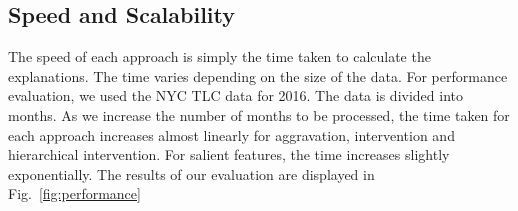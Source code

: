 




\subsection{Speed and Scalability}
\label{sec:speed}
The speed of each approach is simply the time taken to calculate the explanations. The time varies depending on the size of the data. For performance evaluation, we used the NYC TLC data for 2016. The data is divided into months. As we increase the number of months to be processed, the time taken for each approach increases almost linearly for aggravation, intervention and hierarchical intervention. For salient features, the time increases slightly exponentially. The results of our evaluation are displayed in Fig.~\ref{fig:performance}

